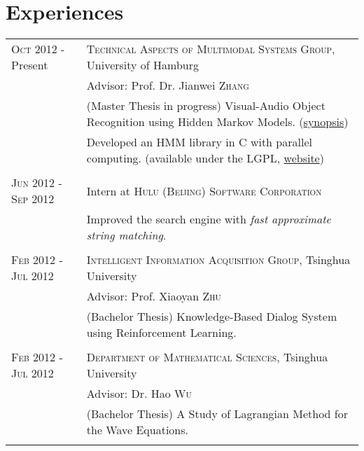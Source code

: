 \documentclass[a4paper,11pt]{article} %
\begin{document}

\section{Experiences}
\begin{tabular}{R{3.5cm}|p{11cm}}	
  \textsc{Oct 2012} - Present & \textsc{Technical Aspects of Multimodal Systems Group}, University of Hamburg \\
  & {\footnotesize Advisor:} Prof. Dr. Jianwei \textsc{Zhang} \\
  & {\footnotesize (Master Thesis in progress) Visual-Audio Object Recognition using Hidden Markov Models. (\hyperlink{synopsis}{synopsis})} \\
  & {\footnotesize Developed an HMM library in C with parallel computing. (available under the LGPL, \href{http://github.com/hwp/notghmm}{website})} \\
   \\


  \textsc{Jun 2012 - Sep 2012} & Intern at \textsc{Hulu (Beijing) Software Corporation} \\
  & {\footnotesize Improved the search engine with \textit{fast approximate string matching}.} \\
   \\


  \textsc{Feb 2012 - Jul 2012} & \textsc{Intelligent Information Acquisition Group}, Tsinghua University \\
  & {\footnotesize Advisor:} Prof. Xiaoyan \textsc{Zhu} \\
  & {\footnotesize (Bachelor Thesis) Knowledge-Based Dialog System using Reinforcement Learning.} \\
   \\


  \textsc{Feb 2012 - Jul 2012} & \textsc{Department of Mathematical Sciences}, Tsinghua University \\
  & {\footnotesize Advisor:} Dr. Hao \textsc{Wu} \\
  & {\footnotesize (Bachelor Thesis) A Study of Lagrangian Method for the Wave Equations.} \\
   \\


\end{tabular}
\end{document}
